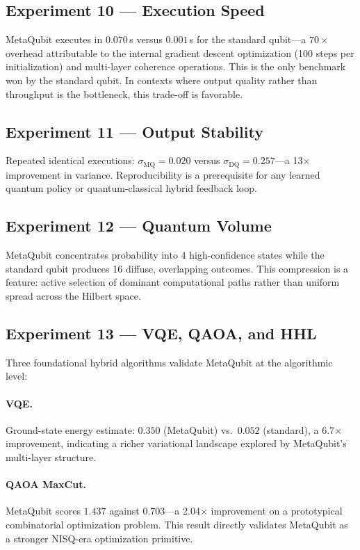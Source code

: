 \documentclass[twocolumn,amsmath,amssymb,prl]{revtex4-2}
\begin{document}
\subsection{Experiment 10 — Execution Speed}

MetaQubit executes in $0.070$\,s versus $0.001$\,s for the standard qubit—a
$70\times$ overhead attributable to the internal gradient descent optimization
(100 steps per initialization) and multi-layer coherence operations.  This
is the only benchmark won by the standard qubit.  In contexts where output
quality rather than throughput is the bottleneck, this trade-off is favorable.

\subsection{Experiment 11 — Output Stability}

Repeated identical executions:
$\sigma_{\mathrm{MQ}} = 0.020$ versus $\sigma_{\mathrm{DQ}} = 0.257$—a 13$\times$
improvement in variance.  Reproducibility is a prerequisite for any learned
quantum policy or quantum-classical hybrid feedback loop.

\subsection{Experiment 12 — Quantum Volume}

MetaQubit concentrates probability into 4 high-confidence states while the
standard qubit produces 16 diffuse, overlapping outcomes.  This compression is
a feature: active selection of dominant computational paths rather than uniform
spread across the Hilbert space.

\subsection{Experiment 13 — VQE, QAOA, and HHL}

Three foundational hybrid algorithms validate MetaQubit at the algorithmic
level:

\paragraph{VQE.}  Ground-state energy estimate: $0.350$ (MetaQubit) vs.\
$0.052$ (standard), a 6.7$\times$ improvement, indicating a richer variational
landscape explored by MetaQubit's multi-layer structure.

\paragraph{QAOA MaxCut.}  MetaQubit scores $1.437$ against $0.703$—a 2.04$\times$
improvement on a prototypical combinatorial optimization problem.  This result
directly validates MetaQubit as a stronger NISQ-era optimization primitive.
\end{document}
